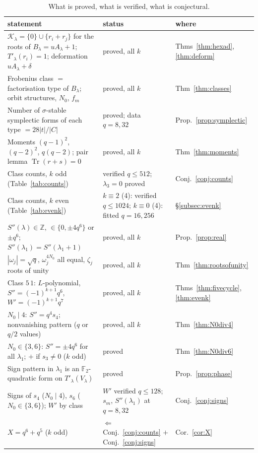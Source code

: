 \documentclass[12pt,a4paper]{amsart}
\theoremstyle{definition}
\newcommand{\F}{\mathbb{F}}
\newcommand{\Z}{\mathbb{Z}}
\newcommand{\Tr}{\operatorname{Tr}}
\newcommand{\Kk}{\mathcal{K}}
\newcommand{\Spp}{S''}
\begin{document}
\begin{table}[H]
\centering
\caption{What is proved, what is verified, what is conjectural.}\label{tab:status}
\footnotesize
\begin{tabular}{@{}p{}p{}p{}@{}}
\toprule
statement & status & where\\
\midrule
$\Kk_\lambda=\{0\}\cup\{r_i+r_j\}$ for the roots of $B_\lambda=uA_\lambda+1$; $T'_\lambda(r_i)=1$; deformation $uA_\lambda+\delta$ & proved, all $k$ & Thms~\ref{thm:hexad}, \ref{thm:deform}\\
Frobenius class $=$ factorisation type of $B_\lambda$; orbit structures, $N_0$, $f_m$ & proved, all $k$ & Thm~\ref{thm:classes}\\
Number of $\sigma$-stable symplectic forms of each type $=28|t|/|C|$ & proved; data $q=8,32$ & Prop.~\ref{prop:symplectic}\\
Moments $(q-1)^2$, $(q-2)^2$, $q(q-2)$; pair lemma $\Tr(r+s)=0$ & proved, all $k$ & Thm~\ref{thm:moments}\\
Class counts, $k$ odd (Table~\ref{tab:counts}) & verified $q\le512$; $\lambda_3=0$ proved & Conj.~\ref{conj:counts}\\
Class counts, $k$ even (Table~\ref{tab:evenk}) & $k\equiv2$ (4): verified $q\le1024$; $k\equiv0$ (4): fitted $q=16,256$ & \S\ref{subsec:evenk}\\
$\Spp(\lambda)\in\Z$, $\in\{0,\pm4q^6\}$ or $\pm q^6$; $\Spp(\lambda_1)=\Spp(\lambda_1+1)$ & proved, all $k$ & Prop.~\ref{prop:real}\\
$|\omega_j|=\sqrt q$, $\omega_j^{4N_0}$ all equal, $\zeta_j$ roots of unity & proved, all $k$ & Thm~\ref{thm:rootsofunity}\\
Class $5\,1$: $L$-polynomial, $\Spp=(-1)^{k+1}q^6$, $W'=(-1)^{k+1}q^7$ & proved, all $k$ & Thms~\ref{thm:fivecycle}, \ref{thm:evenk}\\
$N_0\mid4$: $\Spp=q^4s_4$; nonvanishing pattern ($q$ or $q/2$ values) & proved, all $k$ & Thm~\ref{thm:N0div4}\\
$N_0\in\{3,6\}$: $\Spp=\pm4q^6$ for all $\lambda_1$; $+$ if $s_3\ne0$ ($k$ odd) & proved & Thm~\ref{thm:N0div6}\\
Sign pattern in $\lambda_1$ is an $\F_2$-quadratic form on $T'_\lambda(V_\lambda)$ & proved & Prop.~\ref{prop:phase}\\
Signs of $s_4$ ($N_0\mid4$), $s_6$ ($N_0\in\{3,6\}$); $W'$ by class & $W'$ verified $q\le128$; $s_m$, $\Spp(\lambda_1)$ at $q=8,32$ & Conj.~\ref{conj:signs}\\
$X=q^6+q^5$ ($k$ odd) & $\Leftarrow$ Conj.~\ref{conj:counts} $+$ Conj.~\ref{conj:signs} & Cor.~\ref{cor:X}\\
\bottomrule
\end{tabular}
\end{table}
\end{document}
